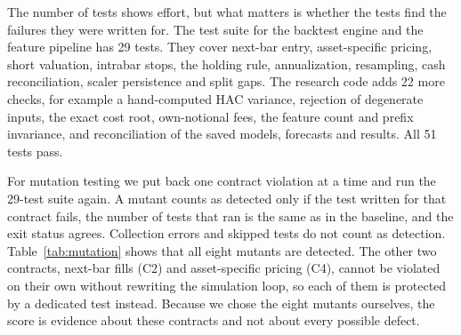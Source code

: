 \documentclass[preprint,12pt,authoryear,a4paper]{elsarticle}
\begin{document}
The number of tests shows effort, but what matters is whether the tests find the
failures they were written for. The test suite for the backtest engine and the
feature pipeline has 29 tests. They cover next-bar entry, asset-specific pricing,
short valuation, intrabar stops, the holding rule, annualization, resampling, cash
reconciliation, scaler persistence and split gaps. The research code adds 22 more
checks, for example a hand-computed HAC variance, rejection of degenerate inputs,
the exact cost root, own-notional fees, the feature count and prefix invariance,
and reconciliation of the saved models, forecasts and results. All 51 tests pass.

For mutation testing we put back one contract violation at a time and run the
29-test suite again. A mutant counts as detected only if the test written for that
contract fails, the number of tests that ran is the same as in the baseline, and
the exit status agrees. Collection errors and skipped tests do not count as
detection. Table~\ref{tab:mutation} shows that all eight mutants are detected. The
other two contracts, next-bar fills (C2) and asset-specific pricing (C4), cannot be
violated on their own without rewriting the simulation loop, so each of them is
protected by a dedicated test instead. Because we chose the eight mutants
ourselves, the score is evidence about these contracts and not about every
possible defect.
\end{document}
